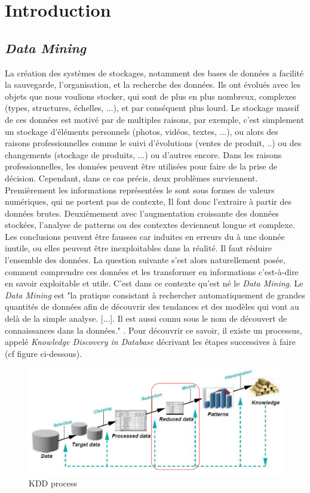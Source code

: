\section{Introduction}
\subsection{\textit{Data Mining}}
La création des systèmes de stockages, notamment des bases de données
a facilité la sauvegarde, l'organisation, et la recherche des données.
Ils ont évolués avec les objets que nous voulions stocker, qui sont de
plus en plus nombreux, complexes (types, structures, échelles, ...),
et par conséquent plus lourd. Le stockage massif de ces données est
motivé par de multiples raisons, par exemple, c'est simplement un
stockage d'éléments personnels (photos, vidéos, textes, ...), ou alors
des raisons professionnelles comme le suivi d'évolutions
(ventes de produit, ..) ou des changements (stockage de produits, ...)
ou d'autres encore.
Dans les raisons professionnelles, les données peuvent être utilisées
pour faire de la prise de décision. Cependant, dans ce cas précis,
deux problèmes surviennent. Premièrement les informations représentées
le sont sous formes de valeurs numériques, qui ne portent pas de
contexte, Il font donc l'extraire à partir des données brutes.
Deuxièmement avec l'augmentation croissante des données stockées,
l'analyse de patterns ou des contextes deviennent longue et complexe.
Les conclusions peuvent être fausses car induites en erreurs du à une
donnée inutile, ou elles peuvent être inexploitables dans la réalité.
Il faut réduire l'ensemble des données. La question suivante s'est
alors naturellement posée, comment comprendre ces données et les
transformer en informations c'est-à-dire en savoir exploitable et
utile. C'est dans ce contexte qu'est né le \textit{Data Mining}.
Le \textit{Data Mining} est "la pratique consistant à rechercher
automatiquement de grandes quantités de données afin de découvrir
des tendances et des modèles qui vont au delà de la simple analyse.
	[...]. Il est aussi connu sous le nom de découvert de connaissances
dans la données." \cite{oracle_data_mining}. Pour découvrir ce savoir,
il existe un processus, appelé \textit{Knowledge Discovery in Database} décrivant les étapes successives à faire (cf figure ci-dessous).

\begin{figure}[h!]
	\centering
	\includegraphics[scale=0.6]{img/kdd_process.png}
	\caption{KDD process}
	\label{fig:kdd_process}
\end{figure}

